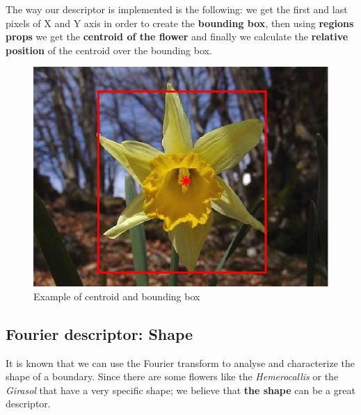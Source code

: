 \documentclass[11]{article}
\begin{document}
The way our descriptor is implemented is the following: we get the first and last pixels of X and Y axis in order to create the \textbf{bounding box}, then using \textbf{regions props} we get the \textbf{centroid of the flower} and finally we calculate the \textbf{relative position} of the centroid over the bounding box. 
\medskip

\begin{figure}[H]
	\centering
	\includegraphics[scale=0.35]{images/centroid.jpg}
	\caption{Example of centroid and bounding box}
	\label{centroidNarcis}
\end{figure}


\subsection{Fourier descriptor: Shape}
It is known that we can use the Fourier transform to analyse and characterize the shape of a boundary. Since there are some flowers like the \textit{Hemerocallis} or the \textit{Girasol} that have a very specific shape; we believe that \textbf{the shape} can be a great descriptor. 
\end{document}
